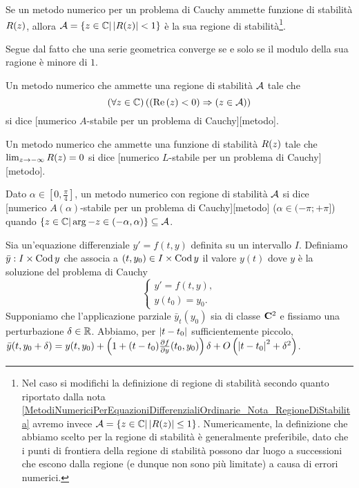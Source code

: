 \begin{Theorem}
	Se un metodo numerico per un problema di Cauchy ammette funzione di stabilit\`a $R(z)$, allora $\mathcal{A} = \lbrace z \in \mathbb{C} | \left \lvert R(z) \right \rvert < 1 \rbrace$ \`e la sua regione di stabilit\`a\footnote{Nel caso si modifichi la definizione di regione di stabilit\`a secondo quanto riportato dalla nota \ref{MetodiNumericiPerEquazioniDifferenzialiOrdinarie_Nota_RegioneDiStabilita} avremo invece $\mathcal{A} = \lbrace z \in \mathbb{C} | \left \lvert R(z) \right \rvert \leq 1 \rbrace$. Numericamente, la definizione che abbiamo scelto per la regione di stabilit\`a \`e generalmente preferibile, dato che i punti di frontiera della regione di stabilit\`a possono dar luogo a successioni che escono dalla regione (e dunque non sono pi\`u limitate) a causa di errori numerici.}.
\end{Theorem}
\Proof Segue dal fatto che una serie geometrica converge se e solo se il modulo della sua ragione \`e minore di $1$. \EndProof
\begin{Definition}
	Un metodo numerico che ammette una regione di stabilit\`a $\mathcal{A}$ tale che
\[
	\left ( \forall z \in \mathbb{C} \right ) \left ( \left ( \text{Re} \left ( z \right ) < 0 \right ) \Rightarrow \left ( z \in \mathcal{A} \right ) \right )
\]
si dice [numerico $A$-stabile per un problema di Cauchy][metodo].
\end{Definition}
\begin{Definition}
	Un metodo numerico che ammette una funzione di stabilit\`a $R(z)$ tale che $\lim_{z \rightarrow - \infty} R(z) = 0$ si dice [numerico $L$-stabile per un problema di Cauchy][metodo].
\end{Definition}
\begin{Definition}
	Dato $\alpha \in \left [ 0,\frac{\pi}{4} \right ]$, un metodo numerico con regione di stabilit\`a $\mathcal{A}$ si dice [numerico $A(\alpha)$-stabile per un problema di Cauchy][metodo] ($\alpha \in (-\pi;+\pi]$) quando $\lbrace z \in \mathbb{C} | \operatorname{arg}{-z} \in (-\alpha,\alpha) \rbrace \subseteq \mathcal{A}$.
\end{Definition}
\begin{Lemma}
	Sia un'equazione differenziale $y' = f(t,y)$ definita su un intervallo $I$.
	Definiamo $\bar{y}: I \times \operatorname{Cod}{y}$ che associa a $(t,y_0) \in I \times \operatorname{Cod}{y}$ il valore $y(t)$ dove $y$ \`e la soluzione del problema di Cauchy
	\[
	\begin{cases}
		y' = f(t,y),\\
		y(t_0) = y_0.
	\end{cases}
	\]
	Supponiamo che l'applicazione parziale $\bar{y}_t(y_0)$ sia di classe $\CClass{2}$ e fissiamo una perturbazione $\Perturbation \in \mathbb{R}$.
	Abbiamo, per $\left \lvert t - t_0 \right \rvert$ sufficientemente piccolo, $\bar{y}(t,y_0 + \Perturbation) = y(t,y_0) + \left ( 1 + (t - t_0) \PartialDerivative{f}{y}(t_0,y_0) \right ) \Perturbation + \BigO{\AbsoluteValue{t - t_0}^2 + \Perturbation^2}$.
\end{Lemma}
